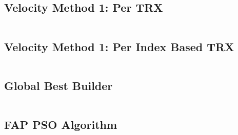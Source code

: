 \subsection{Velocity Method 1: Per TRX}
\inputminted[fontsize=\tiny]{csharp}{../Implementation/PSOFAP/PSOFAPConsole/FAPPSO/Functions/ParticlePerTrxFunction.cs}
\subsection{Velocity Method 1: Per Index Based TRX}
\inputminted[fontsize=\tiny]{csharp}{../Implementation/PSOFAP/PSOFAPConsole/FAPPSO/Functions/PerTRXChannelIndexFunction.cs}
\subsection{Global Best Builder}
\inputminted[fontsize=\tiny]{csharp}{../Implementation/PSOFAP/PSOFAPConsole/FAPPSO/GBestBuilder.cs}
\subsection{FAP PSO Algorithm}
\inputminted[fontsize=\tiny]{csharp}{../Implementation/PSOFAP/PSOFAPConsole/}
